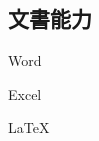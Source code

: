 \documentclass[]{deedy-resume-openfont-ch}
\begin{document}
\begin{minipage}[t]{0.5\textwidth}
\begin{minipage}[t]{0.45\textwidth}
    \subsection{文書能力}
    \vspace{\topsep}
    \vspace{\topsep}
    \begin{tightemize}
        \item Word
        \item Excel
        \item LaTeX\
    \end{tightemize}
\end{minipage}

\end{minipage}
\end{document}
